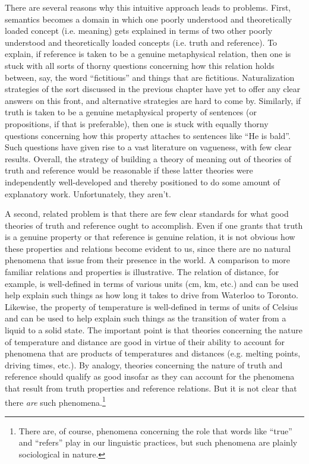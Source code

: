 There are several reasons why this intuitive approach leads to problems. First, semantics becomes a domain in which one poorly understood and theoretically loaded concept (i.e. meaning) gets explained in terms of two other poorly understood and theoretically loaded concepts (i.e. truth and reference). To explain, if reference is taken to be a genuine metaphysical relation, then one is stuck with all sorts of thorny questions concerning how this relation holds between, say, the word ``fictitious'' and things that are fictitious. Naturalization strategies of the sort discussed in the previous chapter have yet to offer any clear answers on this front, and alternative strategies are hard to come by. Similarly, if truth is taken to be a genuine metaphysical property of sentences (or propositions, if that is preferable), then one is stuck with equally thorny questions concerning how this property attaches to sentences like ``He is bald''. Such questions have given rise to a vast literature on vagueness, with few clear results. Overall, the strategy of building a theory of meaning out of theories of truth and reference would be reasonable if these latter theories were independently well-developed and thereby positioned to do some amount of explanatory work. Unfortunately, they aren't. 

A second, related problem is that there are few clear standards for what good theories of truth and reference ought to accomplish. Even if one grants that truth is a genuine property or that reference is genuine relation, it is not obvious how these properties and relations become evident to us, since there are no natural phenomena that issue from their presence in the world. A comparison to more familiar relations and properties is illustrative. The relation of distance, for example, is well-defined in terms of various units (cm, km, etc.) and can be used help explain such things as how long it takes to drive from Waterloo to Toronto. Likewise, the property of temperature is well-defined in terms of units of Celsius and can be used to help explain such things as the transition of water from a liquid to a solid state. The important point is that theories concerning the nature of temperature and distance are good in virtue of their ability to account for phenomena that are products of temperatures and distances (e.g. melting points, driving times, etc.). By analogy, theories concerning the nature of truth and reference should qualify as good insofar as they can account for the phenomena that result from truth properties and reference relations. But it is not clear that there \textit{are} such phenomena.\footnote{There are, of course, phenomena concerning the role that words like ``true'' and ``refers'' play in our linguistic practices, but such phenomena are plainly sociological in nature.}

